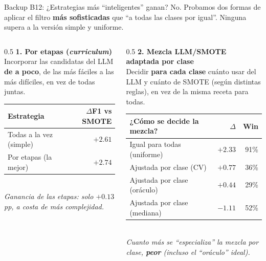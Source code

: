 \begin{frame}{Backup B12: ¿Estrategias más ``inteligentes'' ganan? No.}
\small
Probamos dos formas de aplicar el filtro \textbf{más sofisticadas} que ``a todas las clases por igual''. Ninguna supera a la versión simple y uniforme.

\vspace{0.3em}
\begin{columns}[T]

\begin{column}{0.5\textwidth}
\centering
{\small\textbf{1. Por etapas (\emph{curriculum})}}\\[2pt]
{\scriptsize Incorporar las candidatas del LLM \textbf{de a poco}, de las más fáciles a las más difíciles, en vez de todas juntas.}\\[5pt]
\scriptsize
\setlength{\tabcolsep}{6pt}
\renewcommand{\arraystretch}{1.25}
\begin{tabular}{@{}lr@{}}
\toprule
Estrategia & $\Delta$F1 vs SMOTE \\
\midrule
\rowcolor{uaigreen!12}
Todas a la vez (simple) & $+2{.}61$ \\
Por etapas (la mejor) & $+2{.}74$ \\
\bottomrule
\end{tabular}\\[4pt]
{\tiny\itshape Ganancia de las etapas: solo $+0{.}13$pp, a costa de más complejidad.}
\end{column}

\begin{column}{0.5\textwidth}
\centering
{\small\textbf{2. Mezcla LLM/SMOTE adaptada por clase}}\\[2pt]
{\scriptsize Decidir \textbf{para cada clase} cuánto usar del LLM y cuánto de SMOTE (según distintas reglas), en vez de la misma receta para todas.}\\[5pt]
\scriptsize
\setlength{\tabcolsep}{5pt}
\renewcommand{\arraystretch}{1.2}
\begin{tabular}{@{}lrr@{}}
\toprule
¿Cómo se decide la mezcla? & $\Delta$ & Win \\
\midrule
\rowcolor{uaigreen!12}
Igual para todas (uniforme) & \alert{$+2{.}33$} & 91\% \\
Ajustada por clase (CV) & $+0{.}77$ & 36\% \\
Ajustada por clase (oráculo) & $+0{.}44$ & 29\% \\
Ajustada por clase (mediana) & $-1{.}11$ & 52\% \\
\bottomrule
\end{tabular}\\[4pt]
{\tiny\itshape Cuanto más se ``especializa'' la mezcla por clase, \textbf{peor} (incluso el ``oráculo'' ideal).}
\end{column}


\end{columns}
\end{frame}
